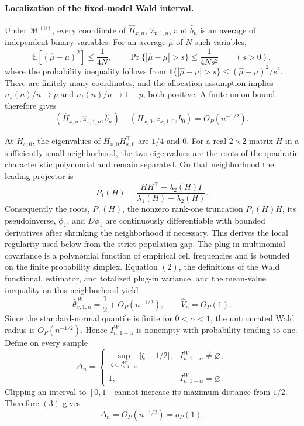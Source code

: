 \paragraph{Localization of the fixed-model Wald interval.}
Under \(\mathcal M^{(0)}\), every coordinate of \(\widehat H_{x,n}\), \(\widehat z_{x,1,n}\), and \(\widehat b_n\) is an average of independent binary variables. For an average \(\widehat\mu\) of \(N\) such variables,
\[
\mathbb E[(\widehat\mu-\mu)^2]\le\frac1{4N},
\qquad
\Pr\{|\widehat\mu-\mu|>s\}
\le\frac{1}{4Ns^2}\qquad(s>0),
\]
where the probability inequality follows from \(\mathbf 1\{|\widehat\mu-\mu|>s\}\le(\widehat\mu-\mu)^2/s^2\). There are finitely many coordinates, and the allocation assumption implies \(n_s(n)/n\to p\) and \(n_t(n)/n\to1-p\), both positive. A finite union bound therefore gives
\[
(\widehat H_{x,n},\widehat z_{x,1,n},\widehat b_n)
-(H_{x,0},z_{x,1,0},b_0)=O_P(n^{-1/2}). \tag{2}
\]

At \(H_{x,0}\), the eigenvalues of \(H_{x,0}H_{x,0}^{\top}\) are \(1/4\) and \(0\). For a real \(2\times2\) matrix \(H\) in a sufficiently small neighborhood, the two eigenvalues are the roots of the quadratic characteristic polynomial and remain separated. On that neighborhood the leading projector is
\[
P_1(H)=\frac{HH^{\top}-\lambda_2(H)I}{\lambda_1(H)-\lambda_2(H)}.
\]
Consequently the roots, \(P_1(H)\), the nonzero rank-one truncation \(P_1(H)H\), its pseudoinverse, \(\phi_1\), and \(D\phi_1\) are continuously differentiable with bounded derivatives after shrinking the neighborhood if necessary. This derives the local regularity used below from the strict population gap. The plug-in multinomial covariance is a polynomial function of empirical cell frequencies and is bounded on the finite probability simplex. Equation \((2)\), the definitions of the Wald functional, estimator, and totalized plug-in variance, and the mean-value inequality on this neighborhood yield
\[
\widehat\theta^{\,W}_{x,1,n}=\frac12+O_P(n^{-1/2}),
\qquad
\widehat V_n=O_P(1). \tag{3}
\]
Since the standard-normal quantile is finite for \(0<\alpha<1\), the untruncated Wald radius is \(O_P(n^{-1/2})\). Hence \(I^W_{n,1-\alpha}\) is nonempty with probability tending to one. Define on every sample
\[
\Delta_n=
\begin{cases}
\displaystyle\sup_{\zeta\in I^W_{n,1-\alpha}}|\zeta-1/2|,
&I^W_{n,1-\alpha}\ne\varnothing,\\
1,&I^W_{n,1-\alpha}=\varnothing.
\end{cases}
\]
Clipping an interval to \([0,1]\) cannot increase its maximum distance from \(1/2\). Therefore \((3)\) gives
\[
\Delta_n=O_P(n^{-1/2})=o_P(1). \tag{4}
\]

